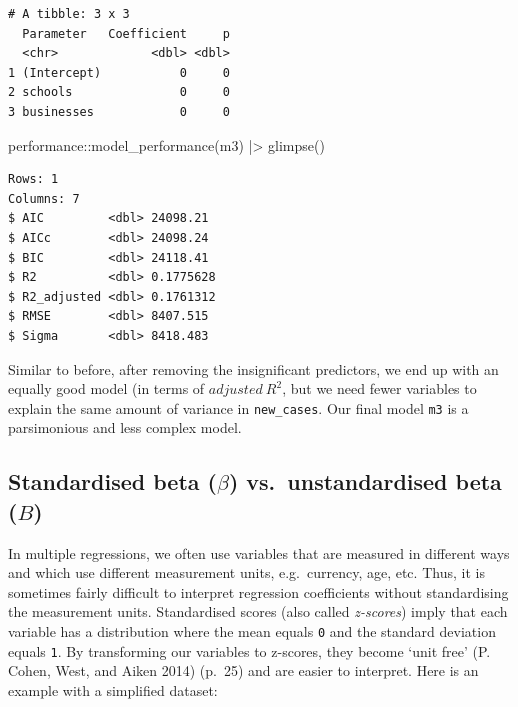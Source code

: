 \documentclass[
  letterpaper,
]{krantz}
\makeatletter
\newenvironment{Shaded}{\begin{snugshade}}{\end{snugshade}}
\newcommand{\FunctionTok}[1]{\textcolor[rgb]{0.28,0.35,0.67}{#1}}
\newcommand{\NormalTok}[1]{\textcolor[rgb]{0.00,0.23,0.31}{#1}}
\newcommand{\SpecialCharTok}[1]{\textcolor[rgb]{0.37,0.37,0.37}{#1}}
\newenvironment{kframe}{%
\medskip{}
\setlength{\fboxsep}{.8em}
 \def\at@end@of@kframe{}%
 \ifinner\ifhmode%
  \def\at@end@of@kframe{\end{minipage}}%
  \begin{minipage}{\columnwidth}%
 \fi\fi%
 \def\FrameCommand##1{\hskip\@totalleftmargin \hskip-\fboxsep
 \colorbox{shadecolor}{##1}\hskip-\fboxsep
     \hskip-\linewidth \hskip-\@totalleftmargin \hskip\columnwidth}%
 \MakeFramed {\advance\hsize-\width
   \@totalleftmargin\z@ \linewidth\hsize
   \@setminipage}}%
 {\par\unskip\endMakeFramed%
 \at@end@of@kframe}
\renewenvironment{Shaded}{\begin{kframe}}{\end{kframe}}
\makeatother
\begin{document}
\begin{verbatim}
# A tibble: 3 x 3
  Parameter   Coefficient     p
  <chr>             <dbl> <dbl>
1 (Intercept)           0     0
2 schools               0     0
3 businesses            0     0
\end{verbatim}

\begin{Shaded}
\begin{Highlighting}[]
\NormalTok{performance}\SpecialCharTok{::}\FunctionTok{model\_performance}\NormalTok{(m3) }\SpecialCharTok{|\textgreater{}}
  \FunctionTok{glimpse}\NormalTok{()}
\end{Highlighting}
\end{Shaded}

\begin{verbatim}
Rows: 1
Columns: 7
$ AIC         <dbl> 24098.21
$ AICc        <dbl> 24098.24
$ BIC         <dbl> 24118.41
$ R2          <dbl> 0.1775628
$ R2_adjusted <dbl> 0.1761312
$ RMSE        <dbl> 8407.515
$ Sigma       <dbl> 8418.483
\end{verbatim}

Similar to before, after removing the insignificant predictors, we end
up with an equally good model (in terms of \(adjusted\ R^2\), but we
need fewer variables to explain the same amount of variance in
\texttt{new\_cases}. Our final model \texttt{m3} is a parsimonious and
less complex model.

\subsection{\texorpdfstring{Standardised beta (\(\beta\))
vs.~unstandardised beta
(\(B\))}{Standardised beta (\textbackslash beta) vs.~unstandardised beta (B)}}\label{sec-standardised-beta-vs-unstandardised-beta}

In multiple regressions, we often use variables that are measured in
different ways and which use different measurement units, e.g.~currency,
age, etc. Thus, it is sometimes fairly difficult to interpret regression
coefficients without standardising the measurement units. Standardised
scores (also called \emph{z-scores}) imply that each variable has a
distribution where the mean equals \texttt{0} and the standard deviation
equals \texttt{1}. By transforming our variables to z-scores, they
become `unit free' (P. Cohen, West, and Aiken 2014) (p.~25) and are
easier to interpret. Here is an example with a simplified dataset:
\end{document}
